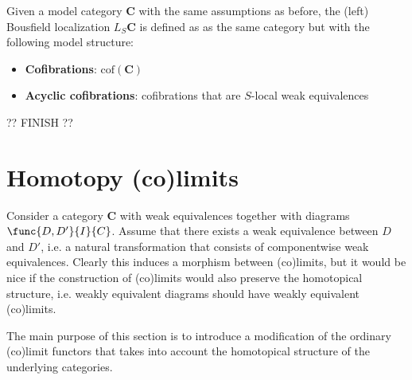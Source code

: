     \begin{construct}
        Given a model category $\mathbf{C}$ with the same assumptions as before, the (left) Bousfield localization $L_S\mathbf{C}$ is defined as as the same category but with the following model structure:
        \begin{itemize}
            \item\textbf{Cofibrations}: $\mathrm{cof}(\mathbf{C})$
            \item\textbf{Acyclic cofibrations}: cofibrations that are $S$-local weak equivalences
        \end{itemize}
    \end{construct}

    ?? FINISH ??

\section{Homotopy (co)limits}

    Consider a category $\mathbf{C}$ with weak equivalences together with diagrams $\func{D,D'}{I}{C}$. Assume that there exists a weak equivalence between $D$ and $D'$, i.e. a natural transformation that consists of componentwise weak equivalences. Clearly this induces a morphism between (co)limits, but it would be nice if the construction of (co)limits would also preserve the homotopical structure, i.e. weakly equivalent diagrams should have weakly equivalent (co)limits.

    The main purpose of this section is to introduce a modification of the ordinary (co)limit functors that takes into account the homotopical structure of the underlying categories.

